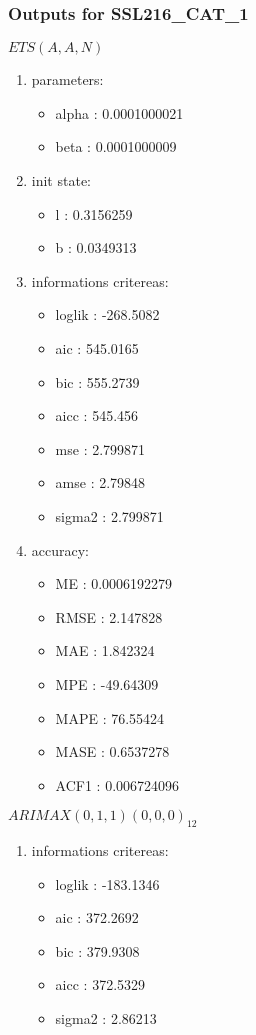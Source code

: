 \documentclass[10pt,a4paper]{article}\usepackage[]{graphicx}\usepackage[]{color}
\newcommand{\AaA}{\_}
\begin{document}
\subsubsection{Outputs for SSL216\AaA CAT\AaA 1}
\begin{multicols}{2}


$ ETS(A,A,N) $
\begin{enumerate}
\item parameters:
\begin{itemize}
\item  alpha :  0.0001000021 
\item  beta :  0.0001000009 
\end{itemize}
\item init state:
\begin{itemize}
\item  l :  0.3156259 
\item  b :  0.0349313 
\end{itemize}
\item informations critereas:
\begin{itemize}
\item  loglik :  -268.5082 
\item  aic :  545.0165 
\item  bic :  555.2739 
\item  aicc :  545.456 
\item  mse :  2.799871 
\item  amse :  2.79848 
\item  sigma2 :  2.799871 
\end{itemize}
\item accuracy:
\begin{itemize}
\item  ME :  0.0006192279 
\item  RMSE :  2.147828 
\item  MAE :  1.842324 
\item  MPE :  -49.64309 
\item  MAPE :  76.55424 
\item  MASE :  0.6537278 
\item  ACF1 :  0.006724096 
\end{itemize}
\end{enumerate}

\columnbreak


 $ARIMAX(0,1,1)(0,0,0)_{12}$ 
\begin{enumerate}
\item informations critereas:
\begin{itemize}
\item  loglik :  -183.1346 
\item  aic :  372.2692 
\item  bic :  379.9308 
\item  aicc :  372.5329 
\item  sigma2 :  2.86213 
\end{itemize}


\end{enumerate}
\end{multicols}
\end{document}
